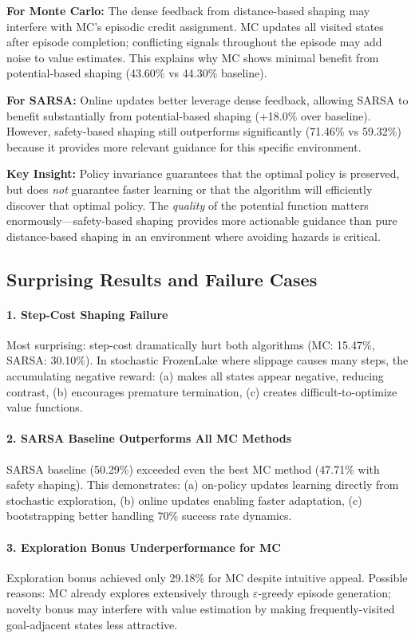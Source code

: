 \documentclass[11pt,a4paper]{article}
\begin{document}
\textbf{For Monte Carlo:} The dense feedback from distance-based shaping may interfere with MC's episodic credit assignment. MC updates all visited states after episode completion; conflicting signals throughout the episode may add noise to value estimates. This explains why MC shows minimal benefit from potential-based shaping (43.60\% vs 44.30\% baseline).

\textbf{For SARSA:} Online updates better leverage dense feedback, allowing SARSA to benefit substantially from potential-based shaping (+18.0\% over baseline). However, safety-based shaping still outperforms significantly (71.46\% vs 59.32\%) because it provides more relevant guidance for this specific environment.

\textbf{Key Insight:} Policy invariance guarantees that the optimal policy is preserved, but does \emph{not} guarantee faster learning or that the algorithm will efficiently discover that optimal policy. The \emph{quality} of the potential function matters enormously---safety-based shaping provides more actionable guidance than pure distance-based shaping in an environment where avoiding hazards is critical.

\subsection{Surprising Results and Failure Cases}

\paragraph{1. Step-Cost Shaping Failure}
Most surprising: step-cost dramatically hurt both algorithms (MC: 15.47\%, SARSA: 30.10\%). In stochastic FrozenLake where slippage causes many steps, the accumulating negative reward: (a) makes all states appear negative, reducing contrast, (b) encourages premature termination, (c) creates difficult-to-optimize value functions.

\paragraph{2. SARSA Baseline Outperforms All MC Methods}
SARSA baseline (50.29\%) exceeded even the best MC method (47.71\% with safety shaping). This demonstrates: (a) on-policy updates learning directly from stochastic exploration, (b) online updates enabling faster adaptation, (c) bootstrapping better handling 70\% success rate dynamics.

\paragraph{3. Exploration Bonus Underperformance for MC}
Exploration bonus achieved only 29.18\% for MC despite intuitive appeal. Possible reasons: MC already explores extensively through $\varepsilon$-greedy episode generation; novelty bonus may interfere with value estimation by making frequently-visited goal-adjacent states less attractive.
\end{document}
